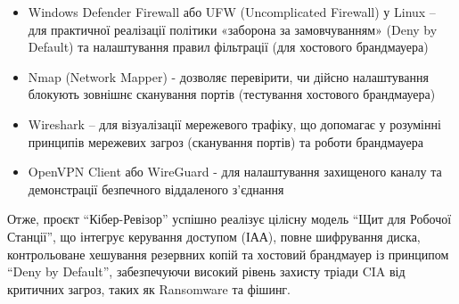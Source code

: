 \begin{itemize}
    \item Windows Defender Firewall або UFW (Uncomplicated Firewall) у Linux – для практичної реалізації політики «заборона за замовчуванням» (Deny by Default) та налаштування правил фільтрації (для хостового брандмауера)
    \item Nmap (Network Mapper) - дозволяє перевірити, чи дійсно налаштування блокують зовнішнє сканування портів (тестування хостового брандмауера)
    \item Wireshark – для візуалізації мережевого трафіку, що допомагає у розумінні принципів мережевих загроз (сканування портів) та роботи брандмауера
    \item OpenVPN Client або WireGuard - для налаштування захищеного каналу та демонстрації безпечного віддаленого з'єднання
\end{itemize}

Отже, проєкт ``Кібер-Ревізор'' успішно реалізує цілісну модель ``Щит для Робочої Станції'', що інтегрує керування доступом (ІАА), повне шифрування диска, контрольоване хешування резервних копій та хостовий брандмауер із принципом ``Deny by Default'', забезпечуючи високий рівень захисту тріади CIA від критичних загроз, таких як Ransomware та фішинг.

\label{last_page}
